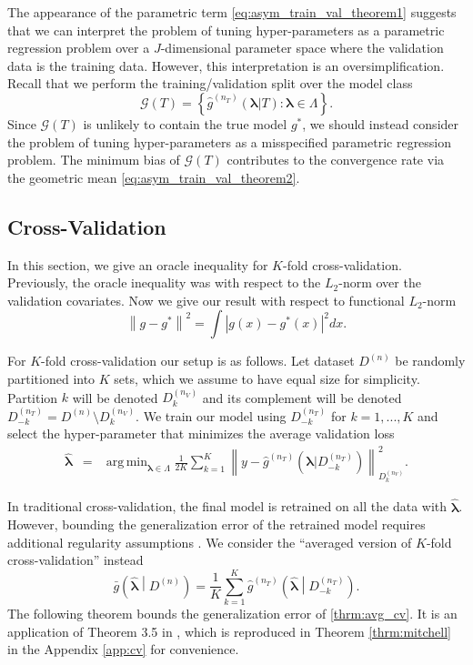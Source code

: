 \documentclass[12pt]{article} %
\theoremstyle{definition}
\DeclareMathOperator*{\argmin}{arg\,min}
\begin{document}
The appearance of the parametric term \eqref{eq:asym_train_val_theorem1} suggests that we can interpret the problem of tuning hyper-parameters as a parametric regression problem over a $J$-dimensional parameter space where the validation data is the training data. However, this interpretation is an oversimplification. Recall that we perform the training/validation split over the model class
\begin{equation}
\mathcal{G}(T) = \left \{ \hat{g}^{(n_T)}( {\boldsymbol{\lambda}}| T) : \boldsymbol{\lambda} \in \Lambda \right \}.
\end{equation}
Since $\mathcal{G}(T)$ is unlikely to contain the true model $g^*$, we should instead consider the problem of tuning hyper-parameters as a misspecified parametric regression problem. The minimum bias of $\mathcal{G}(T)$ contributes to the convergence rate via the geometric mean \eqref{eq:asym_train_val_theorem2}.

\subsection{Cross-Validation}\label{sec:cv}

In this section, we give an oracle inequality for $K$-fold cross-validation. Previously, the oracle inequality was with respect to the $L_2$-norm over the validation covariates. Now we give our result with respect to functional $L_2$-norm
\begin{equation}
\left \| g - g^* \right \|^2 = \int \left |g(x) - g^*(x) \right |^2 dx.
\end{equation}

For $K$-fold cross-validation our setup is as follows. Let dataset $D^{(n)}$ be randomly partitioned into $K$ sets, which we assume to have equal size for simplicity. Partition $k$ will be denoted $D_k^{(n_V)}$ and its complement will be denoted $D_{-k}^{(n_T)} = D^{(n)} \setminus D_k^{(n_V)}$. We train our model using $D_{-k}^{(n_T)}$ for $k=1,...,K$ and select the hyper-parameter that minimizes the average validation loss
\begin{eqnarray}
\label{kfold_opt}
\hat{\boldsymbol \lambda} &=& \argmin_{\boldsymbol{\lambda} \in\Lambda} \frac{1}{2K} \sum_{k=1}^K  \left \| y-\hat{g}^{(n_T)}(\boldsymbol \lambda | D_{-k}^{(n_T)}) \right \|_{D_k^{(n_V)}}^{2}.
\end{eqnarray}

In traditional cross-validation, the final model is retrained on all the data with $\hat{\boldsymbol{\lambda}}$. However, bounding the generalization error of the retrained model requires additional regularity assumptions \citep{lecue2012oracle}. We consider the ``averaged version of $K$-fold cross-validation'' instead
\begin{equation}
\label{thrm:avg_cv}
\bar{g}\left ( \hat{\boldsymbol \lambda} \middle | {D^{(n)}} \right ) = 
\frac{1}{K} \sum_{k=1}^K 
\hat{g}^{(n_T)} \left (\hat{\boldsymbol \lambda} \middle | D^{(n_T)}_{-k} \right ).
\end{equation}
The following theorem bounds the generalization error of \eqref{thrm:avg_cv}. It is an application of Theorem 3.5 in \citet{lecue2012oracle}, which is reproduced in Theorem \ref{thrm:mitchell} in the Appendix \ref{app:cv} for convenience.
\end{document}
